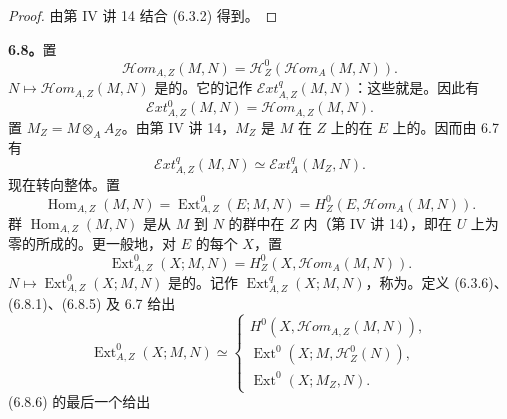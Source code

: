 \begin{proof}由第 IV 讲 14 结合 (6.3.2) 得到。\end{proof}
\textbf{6.8。}置
\begin{equation}\mathscr Hom_{A,Z}(M,N)=\mathscr H_Z^0(\mathscr Hom_A(M,N)).\tag{6.8.1}\end{equation}
 $N\mapsto\mathscr Hom_{A,Z}(M,N)$ 是的。它的记作 $\mathscr Ext_{A,Z}^q(M,N)$：这些就是。因此有
\begin{equation}\mathscr Ext_{A,Z}^0(M,N)=\mathscr Hom_{A,Z}(M,N).\tag{6.8.2}\end{equation}
置 $M_Z=M\otimes_A A_Z$。由第 IV 讲 14，$M_Z$ 是 $M$ 在 $Z$ 上的在 $E$ 上的。因而由 6.7 有
\begin{equation}\mathscr Ext_{A,Z}^q(M,N)\simeq\mathscr Ext_A^q(M_Z,N).\tag{6.8.3}\end{equation}
现在转向整体。置
\begin{equation}\operatorname{Hom}_{A,Z}(M,N)=\operatorname{Ext}_{A,Z}^0(E;M,N)=H_Z^0(E,\mathscr Hom_A(M,N)).\tag{6.8.4}\end{equation}
群 $\operatorname{Hom}_{A,Z}(M,N)$ 是从 $M$ 到 $N$ 的群中在 $Z$ 内（第 IV 讲 14），即在 $U$ 上为零的所成的。更一般地，对 $E$ 的每个 $X$，置
\begin{equation}\operatorname{Ext}_{A,Z}^0(X;M,N)=H_Z^0(X,\mathscr Hom_A(M,N)).\tag{6.8.5}\end{equation}
 $N\mapsto\operatorname{Ext}_{A,Z}^0(X;M,N)$ 是的。记作 $\operatorname{Ext}_{A,Z}^q(X;M,N)$，称为。定义 (6.3.6)、(6.8.1)、(6.8.5) 及 6.7 给出
\begin{equation}\operatorname{Ext}_{A,Z}^0(X;M,N)\simeq
\begin{cases}H^0(X,\mathscr Hom_{A,Z}(M,N)),\\
\operatorname{Ext}^0(X;M,\mathscr H_Z^0(N)),\\
\operatorname{Ext}^0(X;M_Z,N).
\end{cases}\tag{6.8.6}\end{equation}
(6.8.6) 的最后一个给出
